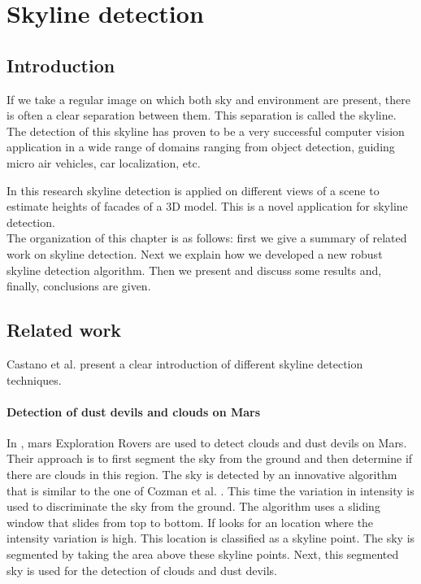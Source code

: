 
\section{Skyline detection}
\label{sec:skylinedetection}
 \subsection{Introduction}
If we take a regular image on which both sky and environment are present, there
is often a clear separation between them. This separation is called the
skyline. %
The detection of this skyline has proven to be a very successful computer vision
application in a wide range of domains ranging from object detection\cite{Dust}, 
guiding micro air vehicles\cite{Guidedflight}, car localization, etc. 

In this research skyline detection is applied on different views of a scene to
estimate heights of facades of a 3D model. This is a novel application for
skyline detection.\\

The organization of this chapter is as follows: first we give a summary of
related work on skyline detection. Next we explain how we developed a new
robust skyline detection algorithm. Then we present and discuss some results
and, finally, conclusions are given.

\subsection{Related work}
Castano et al. \cite{Dust} present a clear introduction of different skyline
detection techniques. 

\paragraph{Detection of dust devils and clouds on Mars}
In \cite{Dust}, mars Exploration Rovers are used to detect clouds and dust devils on Mars.
Their approach is to first segment the sky from the ground and then determine if there are clouds in this region. The sky is detected by an innovative
algorithm that is similar to the one of Cozman et al. \cite{Rover}. 
This time the variation in intensity is used to discriminate the sky from the ground.
The algorithm uses a sliding window that slides from top to bottom. If looks for
an location where the intensity variation is high. This location is classified as a
skyline point. The sky is segmented by taking the area above these skyline
points. Next, this segmented sky is used for the detection of clouds and dust
devils.\\

